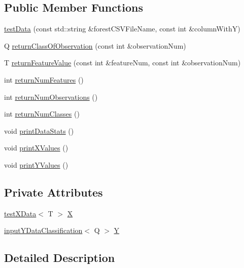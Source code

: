 \subsection*{Public Member Functions}
\begin{DoxyCompactItemize}
\item 
\hyperlink{classfp_1_1testData_a944073c36d749b13e72c8291b672dd90}{test\+Data} (const std\+::string \&forest\+C\+S\+V\+File\+Name, const int \&column\+WithY)
\item 
Q \hyperlink{classfp_1_1testData_a3a964b20b07dd4b49e958fdde93ebc59}{return\+Class\+Of\+Observation} (const int \&observation\+Num)
\item 
T \hyperlink{classfp_1_1testData_a0c49c5fc2f1bf3fc39c7d55413cddabf}{return\+Feature\+Value} (const int \&feature\+Num, const int \&observation\+Num)
\item 
int \hyperlink{classfp_1_1testData_a8a04f896ee478d7c5cb37aeedfe7b821}{return\+Num\+Features} ()
\item 
int \hyperlink{classfp_1_1testData_af9dd7a4aa116d99a11838a02f2154c08}{return\+Num\+Observations} ()
\item 
int \hyperlink{classfp_1_1testData_ae9401fa71005e8c09cb38ed182cbf2ac}{return\+Num\+Classes} ()
\item 
void \hyperlink{classfp_1_1testData_ae9f03130f5c189e7469ac634a2e897c5}{print\+Data\+Stats} ()
\item 
void \hyperlink{classfp_1_1testData_ae15cf957ad0b7339d6956aae12bba197}{print\+X\+Values} ()
\item 
void \hyperlink{classfp_1_1testData_a69269ee27e1c3fb5d3d5ff120a3d7300}{print\+Y\+Values} ()
\end{DoxyCompactItemize}
\subsection*{Private Attributes}
\begin{DoxyCompactItemize}
\item 
\hyperlink{classfp_1_1testXData}{test\+X\+Data}$<$ T $>$ \hyperlink{classfp_1_1testData_ad85120d23de2f6c10d6e9455e5f5adb9}{X}
\item 
\hyperlink{classfp_1_1inputYDataClassification}{input\+Y\+Data\+Classification}$<$ Q $>$ \hyperlink{classfp_1_1testData_a9421a63841491860ddeeb1f7fa0d4219}{Y}
\end{DoxyCompactItemize}


\subsection{Detailed Description}
